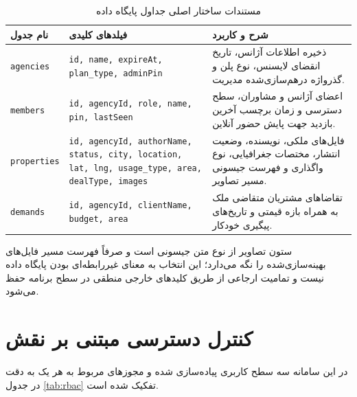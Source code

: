 \documentclass[11pt, a4paper]{report}
\makeatletter
\let\amlak@hline\hline
\newcommand{\code}[1]{\foreignlanguage{english}{\texttt{#1}}}
\let\hline\amlak@hline
\makeatother
\begin{document}
\begin{table}[htbp]
\centering
\caption{مستندات ساختار اصلی جداول پایگاه داده}
\label{tab:db_schema}
\renewcommand{\arraystretch}{1.5}
\begin{tabular}{|p{2.6cm}|p{4.6cm}|p{6.3cm}|}
\hline
\textbf{نام جدول} & \textbf{فیلدهای کلیدی} & \textbf{شرح و کاربرد} \\ \hline
\code{agencies} & \code{id, name, expireAt, plan\_type, adminPin} & ذخیره اطلاعات آژانس، تاریخ انقضای لایسنس، نوع پلن و گذرواژه درهم‌سازی‌شده مدیریت. \\ \hline
\code{members} & \code{id, agencyId, role, name, pin, lastSeen} & اعضای آژانس و مشاوران، سطح دسترسی و زمان برچسب آخرین بازدید جهت پایش حضور آنلاین. \\ \hline
\code{properties} & \code{id, agencyId, authorName, status, city, location, lat, lng, usage\_type, area, dealType, images} & فایل‌های ملکی، نویسنده، وضعیت انتشار، مختصات جغرافیایی، نوع واگذاری و فهرست جیسونی مسیر تصاویر. \\ \hline
\code{demands} & \code{id, agencyId, clientName, budget, area} & تقاضاهای مشتریان متقاضی ملک به همراه بازه قیمتی و تاریخ‌های پیگیری خودکار. \\ \hline
\end{tabular}
\end{table}

ستون تصاویر از نوع متن جیسونی است و صرفاً فهرست مسیر فایل‌های بهینه‌سازی‌شده را نگه می‌دارد؛ این انتخاب به معنای غیررابطه‌ای بودن پایگاه داده نیست و تمامیت ارجاعی از طریق کلیدهای خارجی منطقی در سطح برنامه حفظ می‌شود.

\section{کنترل دسترسی مبتنی بر نقش}
در این سامانه سه سطح کاربری پیاده‌سازی شده و مجوزهای مربوط به هر یک به دقت در جدول \ref{tab:rbac} تفکیک شده است.
\end{document}
